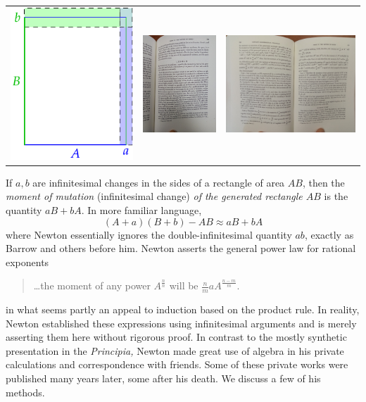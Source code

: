 \begin{center}
	\begin{tabular}{ccc}
		\includegraphics{newton-prodrule}
		&
		\includegraphics[height=140pt]{newton8.jpg}
		&
		\includegraphics[height=140pt]{newton9.jpg}
	\end{tabular}
\end{center}

If $a,b$ are infinitesimal changes in the sides of a rectangle of area $AB$, then the \emph{moment of mutation} (infinitesimal change) \emph{of the generated rectangle $AB$} is the quantity $aB+bA$. In more familiar language,
\[
	(A+a)(B+b)-AB\approx aB+bA
\]
where Newton essentially ignores the double-infinitesimal quantity $ab$, exactly as Barrow and others before him. Newton asserts the general power law for rational exponents 
\begin{quote}
	\ldots the moment of any power $\displaystyle A^{\frac nn}$ will be $\displaystyle\frac nmaA^{\frac{n-m}m}$.
\end{quote}
in what seems partly an appeal to induction based on the product rule. In reality, Newton established these expressions using infinitesimal arguments and is merely asserting them here without rigorous proof. In contrast to the mostly synthetic presentation in the \emph{Principia,} Newton made great use of algebra in his private calculations and correspondence with friends. Some of these private works were published many years later, some after his death. We discuss a few of his methods.

